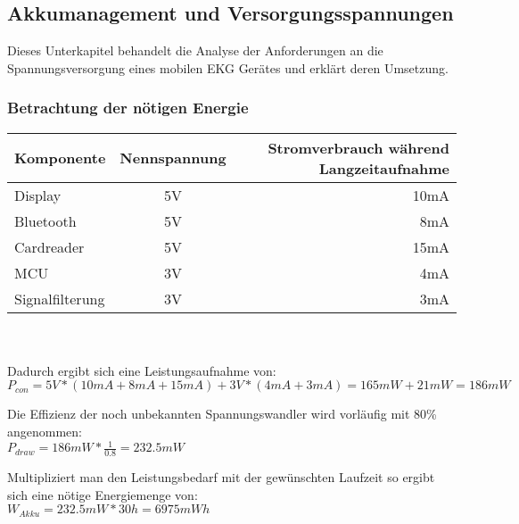 

\subsection{Akkumanagement und Versorgungsspannungen}

Dieses Unterkapitel behandelt die Analyse der Anforderungen an die Spannungsversorgung eines mobilen EKG Gerätes und erklärt deren Umsetzung.

\subsubsection{Betrachtung der nötigen Energie}


%

\begin{tabular}[h]{l|c|r}
Komponente & Nennspannung & Stromverbrauch während Langzeitaufnahme\\
\hline
Display & 5V & 10mA \\
Bluetooth & 5V & 8mA \\
Cardreader & 5V & 15mA \\
MCU & 3V & 4mA \\
Signalfilterung & 3V & 3mA \\
\end{tabular}
\\
\\
Dadurch ergibt sich eine Leistungsaufnahme von:\\
$ P_{con} = 5V * (10mA + 8mA + 15mA) + 3V * (4mA + 3mA) = 165mW + 21mW = 186mW $

Die Effizienz der noch unbekannten Spannungswandler wird vorläufig mit 80\% angenommen:\\
$P_{draw} = 186mW * \frac{1}{0.8} = 232.5mW $

Multipliziert man den Leistungsbedarf mit der gewünschten Laufzeit so ergibt sich eine nötige Energiemenge von:\\
$W_{Akku} = 232.5mW * 30h = 6975mWh$

